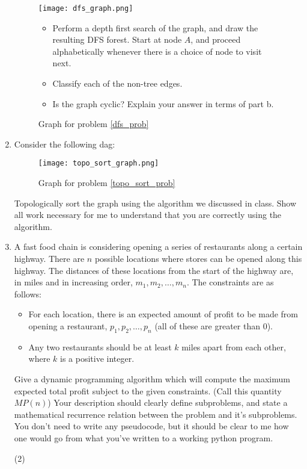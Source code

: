 \documentclass[12pt]{article}
\begin{document}
\begin{enumerate}
    \begin{figure}[h]
        \caption{Graph for problem \ref{dfs_prob}}
    \texttt{[image: dfs\_graph.png]}
    \begin{itemize}
        \item Perform a depth first search of the graph, and draw the resulting DFS forest. Start at node $A$, and proceed alphabetically whenever there is a choice of node to visit next. 
        \item Classify each of the non-tree edges.  
        \item Is the graph cyclic? Explain your answer in terms of part b. 
    \end{itemize}
    \end{figure}
    \label{dfs_prob}
    \newpage
    \item Consider the following dag:
    \begin{figure}[h]
        \caption{Graph for problem \ref{topo_sort_prob}}
        \texttt{[image: topo\_sort\_graph.png]}
    \end{figure}
    Topologically sort the graph using the algorithm we discussed in class. Show all work necessary for me to understand that you are correctly using the algorithm.
    \label{topo_sort_prob}
    \item A fast food chain is considering opening a series of restaurants along a certain highway. There are $n$ possible locations where stores can be opened along this highway. The distances of these locations from the start of the highway are, in miles and in increasing order, $m_1, m_2, \ldots, m_n$. The constraints are as follows:
    \begin{itemize}
        \item For each location, there is an expected amount of profit to be made from opening a restaurant, $p_1, p_2, \ldots, p_n$ (all of these are greater than $0$).
        \item Any two restaurants should be at least $k$ miles apart from each other, where $k$ is a positive integer. 
    \end{itemize} 
    Give a dynamic programming algorithm which will compute the maximum expected total profit subject to the given constraints. (Call this quantity $MP(n)$) Your description should clearly define subproblems, and state a mathematical recurrence relation between the problem and it's subproblems. You don't need to write any pseudocode, but it should be clear to me how one would go from what you've written to a working python program. 

    \item[(2)] 
\end{enumerate}
\end{document}
